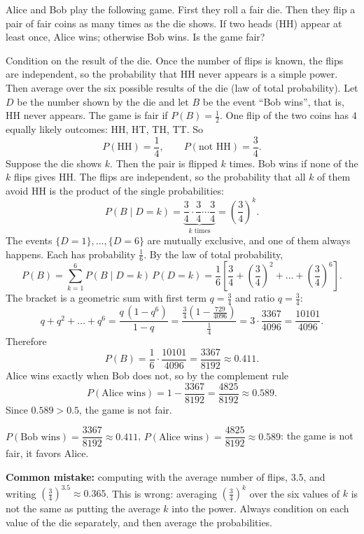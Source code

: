 
\begin{problem}
	Alice and Bob play the following game. First they roll a fair die. Then
	they flip a pair of fair coins as many times as the die shows. If two heads
	(HH) appear at least once, Alice wins; otherwise Bob wins. Is the game fair?
\end{problem}

\begin{solution}
	\idea Condition on the result of the die. Once the number of flips is
	known, the flips are independent, so the probability that HH never
	appears is a simple power. Then average over the six possible results of
	the die (law of total probability).
	 Let $D$ be the number shown by the die and let $B$ be the
	event ``Bob wins'', that is, HH never appears. The game is fair if
	$P(B)=\frac12$.
	 One flip of the two coins has $4$ equally
	likely outcomes: HH, HT, TH, TT. So
	\[ P(\text{HH})=\frac14, \qquad P(\text{not HH})=\frac34. \]
	 Suppose the die shows $k$. Then the pair is
	flipped $k$ times. Bob wins if none of the $k$ flips gives HH. The flips
	are independent, so the probability that all $k$ of them avoid HH is the
	product of the single probabilities:
	\[ P(B\mid D=k)=\underbrace{\frac34\cdot\frac34\cdots\frac34}_{k\text{ times}}
		=\left(\frac34\right)^k. \]
	 The events $\{D=1\},\dots,\{D=6\}$ are
	mutually exclusive, and one of them always happens. Each has probability
	$\frac16$. By the law of total probability,
	\[ P(B)=\sum_{k=1}^{6}P(B\mid D=k)\,P(D=k)
		=\frac16\left[\frac34+\left(\frac34\right)^2+\dots+\left(\frac34\right)^6\right]. \]
	 The bracket is a geometric sum with first term
	$q=\frac34$ and ratio $q=\frac34$:
	\[ q+q^2+\dots+q^6=\frac{q\,(1-q^6)}{1-q}
		=\frac{\frac34\left(1-\frac{729}{4096}\right)}{\frac14}
		=3\cdot\frac{3367}{4096}=\frac{10101}{4096}. \]
	Therefore
	\[ P(B)=\frac16\cdot\frac{10101}{4096}=\frac{3367}{8192}\approx0.411. \]
	 Alice wins exactly when Bob does not, so by the complement
	rule
	\[ P(\text{Alice wins})=1-\frac{3367}{8192}=\frac{4825}{8192}\approx0.589. \]
	Since $0.589>0.5$, the game is not fair.
	\begin{answer}
		$P(\text{Bob wins})=\dfrac{3367}{8192}\approx0.411$,
		$P(\text{Alice wins})=\dfrac{4825}{8192}\approx0.589$: the game is not
		fair, it favors Alice.
	\end{answer}
	\begin{remark}
		\textbf{Common mistake:} computing with the average number of flips,
		$3.5$, and writing $\left(\frac34\right)^{3.5}\approx0.365$. This is
		wrong: averaging $\left(\frac34\right)^k$ over the six values of $k$ is
		not the same as putting the average $k$ into the power. Always condition
		on each value of the die separately, and then average the
		probabilities.
	\end{remark}
\end{solution}
